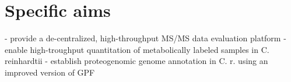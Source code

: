 \chapter{Specific aims}

\begin{todo}
- provide a de-centralized, high-throughput MS/MS data evaluation platform
- enable high-troughput quantitation of metabolically labeled samples in C. reinhardtii
- establish proteogenomic genome annotation in C. r. using an improved version of GPF
\end{todo}

